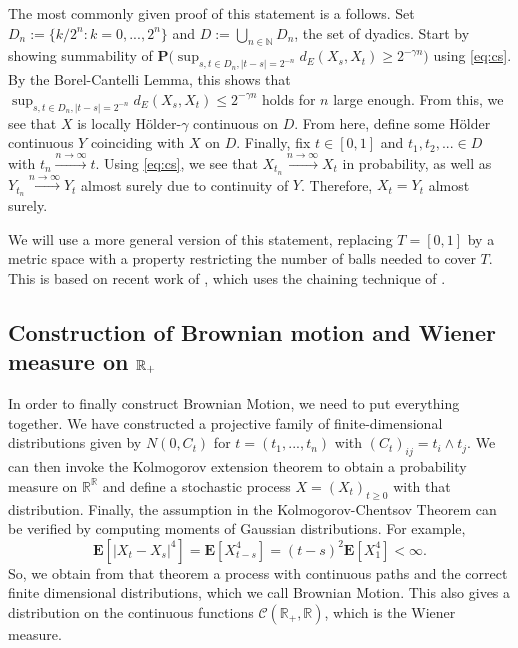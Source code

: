 \documentclass[lean]{Draft}
\begin{document}
The most commonly given proof of this statement is a follows.
Set $D_n := \{k/2^n: k=0,...,2^n\}$ and $D := \bigcup_{n\in\mathbb N} D_n$, the set of dyadics. Start by showing summability of $\mathbf P\Big( \sup_{s,t\in D_n, |t-s| = 2^{-n}} d_E(X_s, X_t) \geq 2^{-\gamma n} \Big)$ using \eqref{eq:cs}.
By the Borel-Cantelli Lemma, this shows that $\sup_{s,t\in D_n, |t-s| = 2^{-n}} d_E(X_s, X_t) \leq 2^{-\gamma n}$ holds for $n$ large enough.
From this, we see that $X$ is locally Hölder-$\gamma$ continuous on $D$.
From here, define some Hölder continuous $Y$ coinciding with $X$ on $D$.
Finally, fix $t \in [0,1]$ and $t_1, t_2,...\in D$ with $t_n \xrightarrow{n\to\infty} t$.
Using \eqref{eq:cs}, we see that $X_{t_n} \xrightarrow{n\to\infty} X_t$ in probability, as well as $Y_{t_n} \xrightarrow{n\to\infty} Y_t$ almost surely due to continuity of $Y$.
Therefore, $X_t = Y_t$ almost surely.

We will use a more general version of this statement, replacing $T = [0,1]$ by a metric space with a property restricting the number of balls needed to cover $T$. This is based on recent work of \cite{kratschmer2023kolmogorov}, which uses the chaining technique of \cite{talagrand2014}.



\subsection{Construction of Brownian motion and Wiener measure on $\mathbb{R}_+$}

In order to finally construct Brownian Motion, we need to put everything together.
We have constructed a projective family of finite-dimensional distributions given by $N(0,C_t)$ for $t = (t_1,...,t_n)$ with $(C_t)_{ij} = t_i \wedge t_j$.
We can then invoke the Kolmogorov extension theorem to obtain a probability measure on $\mathbb{R}^{\mathbb{R}}$ and define a stochastic process $X = (X_t)_{t\geq 0}$ with that distribution.
Finally, the assumption in the Kolmogorov-Chentsov Theorem can be verified by computing moments of Gaussian distributions.
For example,
\[ \mathbf E[|X_t - X_s|^4] = \mathbf E[X_{t-s}^4] = (t-s)^2 \mathbf E[X_{1}^4] < \infty.\]
So, we obtain from that theorem a process with continuous paths and the correct finite dimensional distributions, which we call Brownian Motion.
This also gives a distribution on the continuous functions $\mathcal C(\mathbb R_+, \mathbb R)$, which is the Wiener measure.
\end{document}
